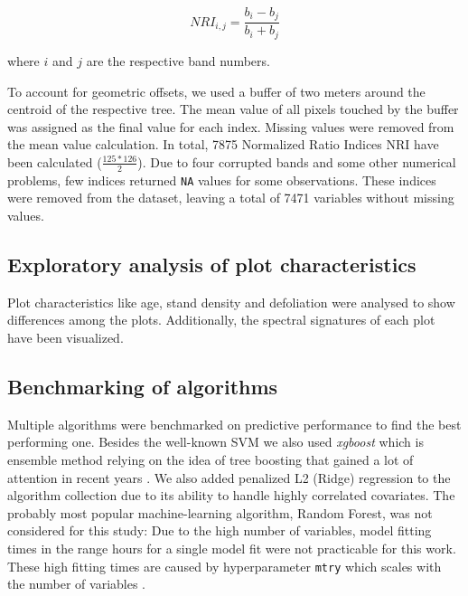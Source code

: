 \documentclass[review]{elsarticle}
\begin{document}
\begin{equation}
	NRI_{i,j} = \frac{b_{i} - b_{j}}{b_{i} + b_{j}}
\end{equation}

\noindent
where $i$ and $j$ are the respective band numbers.

To account for geometric offsets, we used a buffer of two meters around the centroid of the respective tree.
The mean value of all pixels touched by the buffer was assigned as the final value for each index.
Missing values were removed from the mean value calculation.
In total, 7875 Normalized Ratio Indices NRI have been calculated ($\frac{125*126}{2}$).
Due to four corrupted bands and some other numerical problems, few indices returned \texttt{NA} values for some observations.
These indices were removed from the dataset, leaving a total of 7471 variables without missing values.

\subsection{Exploratory analysis of plot characteristics}

Plot characteristics like age, stand density and defoliation were analysed to show differences among the plots.
Additionally, the spectral signatures of each plot have been visualized.

\subsection{Benchmarking of algorithms}

Multiple algorithms were benchmarked on predictive performance to find the best performing one.
Besides the well-known \ac{SVM} \citep{Vapnik1998} we also used \textit{xgboost} which is ensemble method relying on the idea of tree boosting that gained a lot of attention in recent years \citep{chenXGBoostScalableTree2016}.
We also added penalized L2 (Ridge) regression to the algorithm collection due to its ability to handle highly correlated covariates.
The probably most popular machine-learning algorithm, Random Forest, was not considered for this study: Due to the high number of variables, model fitting times in the range hours for a single model fit were not practicable for this work.
These high fitting times are caused by hyperparameter \texttt{mtry} which scales with the number of variables \citep{Probst2018b}.
\end{document}
